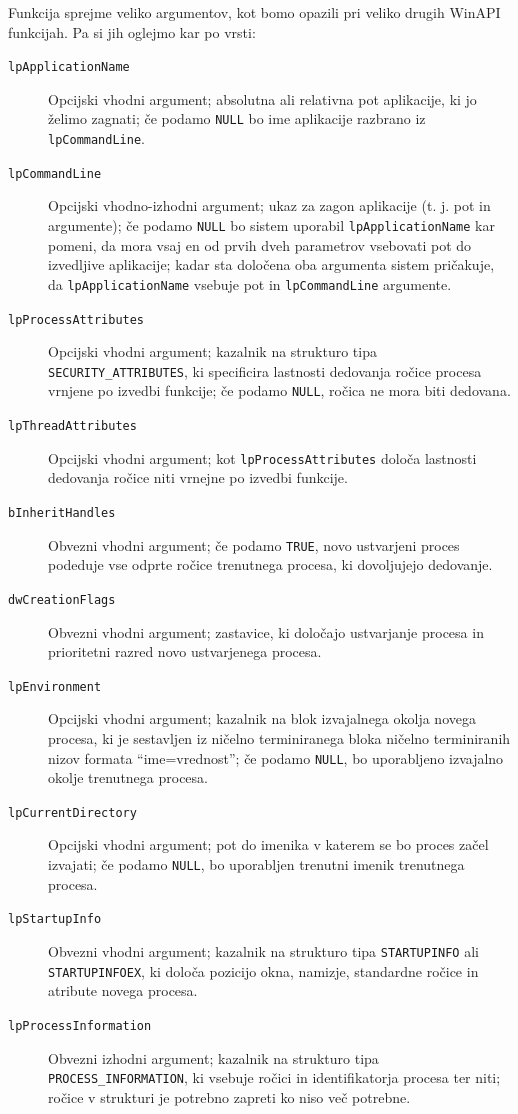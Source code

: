 \documentclass[a4paper,12pt,openright]{book}
\begin{document}
Funkcija sprejme veliko argumentov, kot bomo opazili pri veliko drugih WinAPI funkcijah.
Pa si jih oglejmo kar po vrsti:
\begin{description}
	\item[\texttt{lpApplicationName}] Opcijski vhodni argument; absolutna ali relativna pot aplikacije, ki jo želimo zagnati; če podamo \texttt{NULL} bo ime aplikacije razbrano iz \texttt{lpCommandLine}.
	\item[\texttt{lpCommandLine}] Opcijski vhodno-izhodni argument; ukaz za zagon aplikacije (t. j. pot in argumente); če podamo \texttt{NULL} bo sistem uporabil \texttt{lpApplicationName} kar pomeni, da mora vsaj en od prvih dveh parametrov vsebovati pot do izvedljive aplikacije; kadar sta določena oba argumenta sistem pričakuje, da \texttt{lpApplicationName} vsebuje pot in \texttt{lpCommandLine} argumente.
	\item[\texttt{lpProcessAttributes}] Opcijski vhodni argument; kazalnik na strukturo tipa \texttt{SECURITY\_ATTRIBUTES}, ki specificira lastnosti dedovanja ročice procesa vrnjene po izvedbi funkcije; če podamo \texttt{NULL}, ročica ne mora biti dedovana.
	\item[\texttt{lpThreadAttributes}] Opcijski vhodni argument; kot \texttt{lpProcessAttributes} določa lastnosti dedovanja ročice niti vrnejne po izvedbi funkcije.
	\item[\texttt{bInheritHandles}] Obvezni vhodni argument; če podamo \texttt{TRUE}, novo ustvarjeni proces podeduje vse odprte ročice trenutnega procesa, ki dovoljujejo dedovanje.
	\item[\texttt{dwCreationFlags}] Obvezni vhodni argument; zastavice, ki določajo ustvarjanje procesa in prioritetni razred novo ustvarjenega procesa.
	\item[\texttt{lpEnvironment}] Opcijski vhodni argument; kazalnik na blok izvajalnega okolja novega procesa, ki je sestavljen iz ničelno terminiranega bloka ničelno terminiranih nizov formata ``ime=vrednost''; če podamo \texttt{NULL}, bo uporabljeno izvajalno okolje trenutnega procesa.
	\item[\texttt{lpCurrentDirectory}] Opcijski vhodni argument; pot do imenika v katerem se bo proces začel izvajati; če podamo \texttt{NULL}, bo uporabljen trenutni imenik trenutnega procesa.
	\item[\texttt{lpStartupInfo}] Obvezni vhodni argument; kazalnik na strukturo tipa \texttt{STARTUP\-INFO} ali \texttt{STARTUPINFOEX}, ki določa pozicijo okna, namizje, standardne ročice in atribute novega procesa.
	\item[\texttt{lpProcessInformation}] Obvezni izhodni argument; kazalnik na strukturo tipa \texttt{PROCESS\-\_INFORMATION}, ki vsebuje ročici in identifikatorja procesa ter niti; ročice v strukturi je potrebno zapreti ko niso več potrebne.
\end{description}
\end{document}
